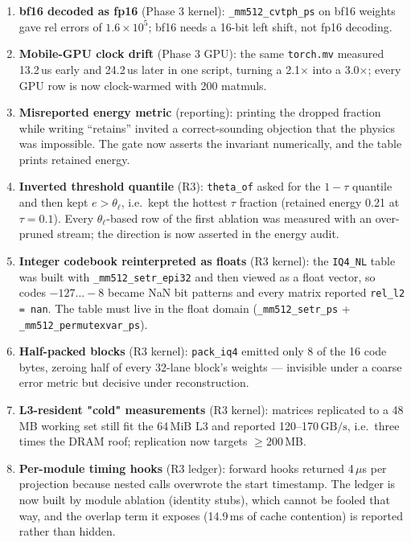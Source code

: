 \documentclass[11pt]{article}
\newcommand{\thetal}{\theta_\ell}
\newcommand{\code}[1]{\texttt{\small #1}}
\newcommand{\gbps}{\ensuremath{\,\mathrm{GB/s}}}
\begin{document}
\begin{enumerate}
of per token made a $T{=}64$ threshold $\approx$220$\times$ too large at decode and masked
every block (``degenerate'' rows). The statistic must be a per-token RMS and the threshold
the \emph{low} quantile; an intermediate version also used the $\tau$-quantile instead of
$1-\tau$ and dropped the hottest blocks first.
\item \textbf{bf16 decoded as fp16} (Phase 3 kernel): \code{\_mm512\_cvtph\_ps} on bf16
weights gave rel errors of $1.6\times10^{5}$; bf16 needs a 16-bit left shift, not fp16
decoding.
\item \textbf{Mobile-GPU clock drift} (Phase 3 GPU): the same \code{torch.mv} measured
13.2\,us early and 24.2\,us later in one script, turning a 2.1$\times$ into a 3.0$\times$;
every GPU row is now clock-warmed with 200 matmuls.
\item \textbf{Misreported energy metric} (reporting): printing the dropped fraction while
writing ``retains'' invited a correct-sounding objection that the physics was impossible.
The gate now asserts the invariant numerically, and the table prints retained energy.
\item \textbf{Inverted threshold quantile} (R3): \code{theta\_of} asked for the $1-\tau$
quantile and then kept $e>\thetal$, i.e.\ kept the hottest $\tau$ fraction (retained energy
0.21 at $\tau{=}0.1$). Every $\thetal$-based row of the first ablation was measured with an
over-pruned stream; the direction is now asserted in the energy audit.
\item \textbf{Integer codebook reinterpreted as floats} (R3 kernel): the \code{IQ4\_NL} table
was built with \code{\_mm512\_setr\_epi32} and then viewed as a float vector, so codes
$-127\ldots-8$ became NaN bit patterns and every matrix reported \code{rel\_l2 = nan}. The
table must live in the float domain (\code{\_mm512\_setr\_ps} + \code{\_mm512\_permutexvar\_ps}).
\item \textbf{Half-packed blocks} (R3 kernel): \code{pack\_iq4} emitted only 8 of the 16 code
bytes, zeroing half of every 32-lane block's weights --- invisible under a coarse error
metric but decisive under reconstruction.
\item \textbf{L3-resident "cold" measurements} (R3 kernel): matrices replicated to a 48\,MB
working set still fit the 64\,MiB L3 and reported 120--170\gbps, i.e.\ three times the DRAM
roof; replication now targets $\ge200$\,MB.
\item \textbf{Per-module timing hooks} (R3 ledger): forward hooks returned 4\,$\mu$s per
projection because nested calls overwrote the start timestamp. The ledger is now built by
module ablation (identity stubs), which cannot be fooled that way, and the overlap term it
exposes (14.9\,ms of cache contention) is reported rather than hidden.
\end{enumerate}
\end{document}
